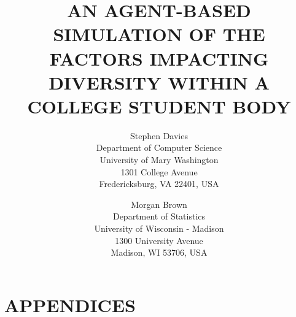 \documentclass{wscpaperproc}
\begin{document}

\title{AN AGENT-BASED SIMULATION OF THE FACTORS IMPACTING \\DIVERSITY WITHIN A
COLLEGE STUDENT BODY}

\author{Stephen Davies\\ [12pt]
Department of Computer Science \\
University of Mary Washington\\
1301 College Avenue \\
Fredericksburg, VA 22401, USA
\and
Morgan Brown\\[12pt]
Department of Statistics \\
University of Wisconsin - Madison\\
1300 University Avenue\\
Madison, WI 53706, USA \\
}

\maketitle









\appendix

\section{APPENDICES}

\vspace{6pt}





\end{document}
